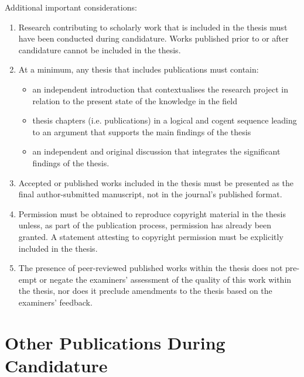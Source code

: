 \begin{instructional}
    
    \noindent
    Additional important considerations:
	\begin{enumerate}
		\item	Research contributing to scholarly work that is included in the thesis must have been conducted during candidature. Works published prior to or after candidature cannot be included in the thesis.
		\item	At a minimum, any thesis that includes publications must contain:
            \begin{itemize}[after=\vspace{0pt}] 
                \item an independent introduction that contextualises the research project in relation to the present state of the knowledge in the field
                \item thesis chapters (i.e. publications) in a logical and cogent sequence leading to an argument that supports the main findings of the thesis
                \item an independent and original discussion that integrates the significant findings of the thesis.
            \end{itemize}
		\item	Accepted or published works included in the thesis must be presented as the final author-submitted manuscript, not in the journal's published format.		\item	Permission must be obtained to reproduce copyright material in the thesis unless, as part of the publication process, permission has already been granted. A statement attesting to copyright permission must be explicitly included in the thesis.	
        \item	The presence of peer-reviewed published works within the thesis does not pre-empt or negate the examiners' assessment of the quality of this work within the thesis, nor does it preclude amendments to the thesis based on the examiners' feedback.
	\end{enumerate}
	
\end{instructional}





\section*{Other Publications During Candidature}

